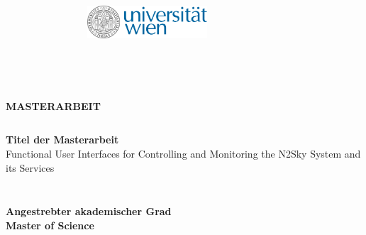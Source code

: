 


%


\thispagestyle{empty}


\begin{figure}[t]
 \centering

~~~~~~~~~~
\includegraphics[width=0.4\textwidth, right]{components/core/uni_logo.png}

\end{figure}


\begin{verbatim}


\end{verbatim}


\begin{verbatim}


\end{verbatim}

\begin{center}
\doublespacing
\textbf{\LARGE MASTERARBEIT}\\
\singlespacing
\begin{verbatim}

\end{verbatim}
\textbf{{Titel der Masterarbeit}} \\
\LARGE Functional User Interfaces for Controlling and Monitoring the N2Sky System and its Services\\
\end{center}
\begin{verbatim}

\end{verbatim}
\begin{center}

\end{center}
\begin{verbatim}

\end{verbatim}
\begin{center}
\textbf{Angestrebter akademischer Grad \\ Master of Science}
\end{center}
\begin{verbatim}





\end{verbatim}

